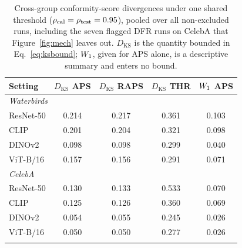 \begin{table}[!ht]
\centering
\caption{Cross-group conformity-score divergences under one shared threshold ($\rho_{\mathrm{cal}}=\rho_{\mathrm{test}}=0.95$), pooled over all non-excluded runs, including the seven flagged DFR runs on CelebA that Figure~\ref{fig:mech} leaves out. $D_{\mathrm{KS}}$ is the quantity bounded in Eq.~\eqref{eq:ksbound}; $W_1$, given for APS alone, is a descriptive summary and enters no bound.}
\label{tab:div}
\footnotesize
\setlength{\tabcolsep}{3.5pt}
\begin{tabular}{lcccc}
\toprule
Setting & $D_{\mathrm{KS}}$ APS & $D_{\mathrm{KS}}$ RAPS & $D_{\mathrm{KS}}$ THR & $W_1$ APS \\
\midrule
\multicolumn{5}{l}{\emph{Waterbirds}} \\
ResNet-50 & 0.214 & 0.217 & 0.361 & 0.103 \\
CLIP & 0.201 & 0.204 & 0.321 & 0.098 \\
DINOv2 & 0.098 & 0.098 & 0.299 & 0.040 \\
ViT-B/16 & 0.157 & 0.156 & 0.291 & 0.071 \\
\multicolumn{5}{l}{\emph{CelebA}} \\
ResNet-50 & 0.130 & 0.133 & 0.533 & 0.070 \\
CLIP & 0.125 & 0.126 & 0.360 & 0.069 \\
DINOv2 & 0.054 & 0.055 & 0.245 & 0.026 \\
ViT-B/16 & 0.050 & 0.050 & 0.277 & 0.026 \\
\botrule
\end{tabular}
\end{table}

